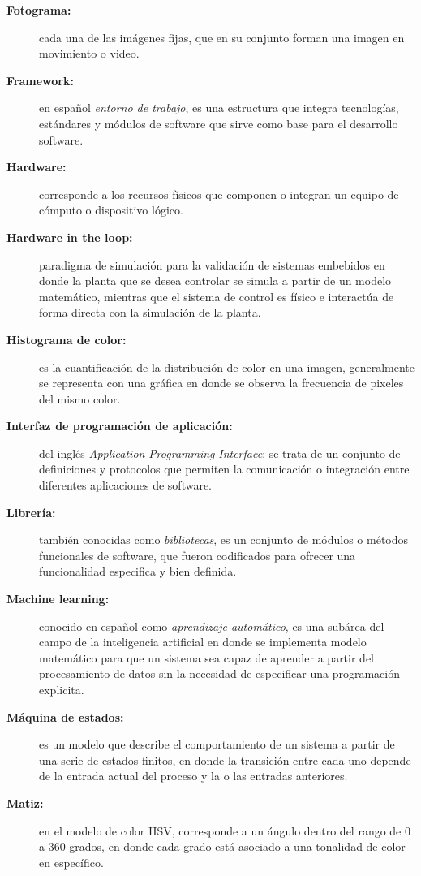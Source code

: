 \begin{description}
  \item[\textbf{Fotograma:}] cada una de las imágenes fijas, que en su conjunto forman una imagen en movimiento o video.
  \item[\textbf{Framework:}] en español \textit{entorno de trabajo}, es una estructura que integra tecnologías, estándares y módulos de software que sirve como base para el desarrollo software.
  \item[\textbf{Hardware:}] corresponde a los recursos físicos que componen o integran un equipo de cómputo o dispositivo lógico.
  \item[\textbf{Hardware in the loop:}] paradigma de simulación para la validación de sistemas embebidos en donde la planta que se desea controlar se simula a partir de un modelo matemático, mientras que el sistema de control es físico e interactúa de forma directa con la simulación de la planta.
  \item[\textbf{Histograma de color:}] es la cuantificación de la distribución de color en una imagen, generalmente se representa con una gráfica en donde se observa la frecuencia de pixeles del mismo color.
  \item[\textbf{Interfaz de programación de aplicación:}] del inglés \textit{Application} \textit{Programming} \textit{Interface}; se trata de un conjunto de definiciones y protocolos que permiten la comunicación o integración entre diferentes aplicaciones de software.
  \item[\textbf{Librería:}] también conocidas como \textit{bibliotecas}, es un conjunto de módulos o métodos funcionales de software, que fueron codificados para ofrecer una funcionalidad especifica y bien definida.
  \item[\textbf{Machine learning:}] conocido en español como \textit{aprendizaje automático}, es una subárea del campo de la inteligencia artificial en donde se implementa modelo matemático para que un sistema sea capaz de aprender a partir del procesamiento de datos sin la necesidad de especificar una programación explicita.
  \item[\textbf{Máquina de estados:}] es un modelo que describe el comportamiento de un sistema a partir de una serie de estados finitos, en donde la transición entre cada uno depende de la entrada actual del proceso y la o las entradas anteriores.
  \item[\textbf{Matiz:}] en el modelo de color HSV, corresponde a un ángulo dentro del rango de 0 a 360 grados, en donde cada grado está asociado a una tonalidad de color en específico.

\end{description}
